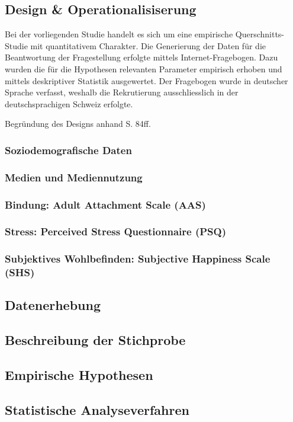 \subsection{Design \& Operationalisiserung} \label{sec:Design}
Bei der vorliegenden Studie handelt es sich um eine empirische Querschnitts-Studie mit quantitativem Charakter. Die Generierung der Daten für die Beantwortung der Fragestellung erfolgte mittels Internet-Fragebogen. Dazu wurden die für die Hypothesen relevanten Parameter empirisch erhoben und mittels deskriptiver Statistik ausgewertet. Der Fragebogen wurde in deutscher Sprache verfasst, weshalb die Rekrutierung ausschliesslich in der deutschsprachigen Schweiz erfolgte.

Begründung des Designs anhand  S. 84ff.

\subsubsection{Soziodemografische Daten}
\subsubsection{Medien und Mediennutzung}
\subsubsection{Bindung: Adult Attachment Scale (AAS)}
\subsubsection{Stress: Perceived Stress Questionnaire (PSQ)}
\subsubsection{Subjektives Wohlbefinden: Subjective Happiness Scale (SHS)}


\subsection{Datenerhebung}
\subsection{Beschreibung der Stichprobe}
\subsection{Empirische Hypothesen}\label{sec:EmpirischeHypothesen}
\subsection{Statistische Analyseverfahren}